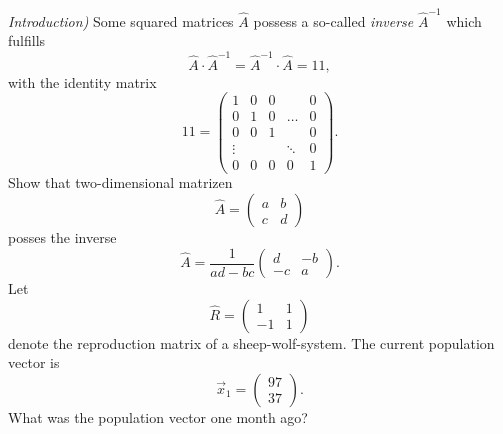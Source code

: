  \subexercise[%
  topic={Matrix inversion},
    ]
    \emph{Introduction)}
    Some squared matrices $\hat A$ possess a so-called \textit{inverse}
    $\hat A^{-1}$ which fulfills
    \begin{equation}
        \hat A \cdot \hat A^{-1} = \hat A^{-1}\cdot \hat A = 1\!\!\!1,
    \end{equation}
    with the identity matrix
    \begin{equation}
        1\!\!\!1 = \left(\begin{matrix}
                1 & 0 & 0& \ & 0\\
                0 & 1 & 0&\dots & 0\\
                0 & 0 & 1 &\ & 0\\
                \vdots & \ & \ & \ddots & 0\\
                0 & 0 & 0 & 0 & 1 
            \end{matrix}\right).
    \end{equation}
    Show that two-dimensional matrizen
    \begin{equation}
        \hat A = \left(\begin{matrix} a & b \\ c & d
            \end{matrix}\right)
    \end{equation}
    posses the inverse
    \begin{equation}
        \hat A = \frac{1}{ad-bc}\left(\begin{matrix} d & -b \\ -c & a
            \end{matrix}\right).
    \end{equation}
    Let
    \begin{equation}
        \hat R = \left(\begin{matrix} 1 & 1 \\ -1 & 1
            \end{matrix}\right)
    \end{equation}
    denote the reproduction matrix of a sheep-wolf-system.
    The current population vector is
   \begin{equation}
       \vec x_1 = \left(\begin{matrix}
               97\\
               37
           \end{matrix}\right).
   \end{equation}
   What was the population vector one month ago?
 
